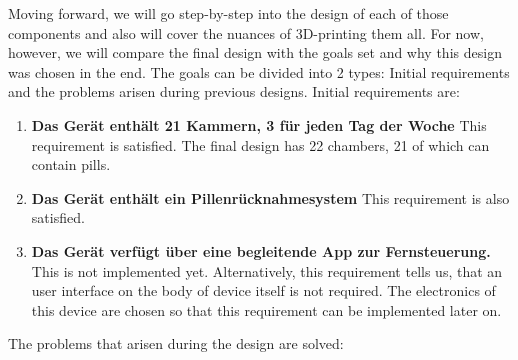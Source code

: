 Moving forward, we will go step-by-step into the design of each of those components and also will cover the nuances of 3D-printing them all. For now, however, we will compare the final design with the goals set and why this design was chosen in the end. The goals can be divided into 2 types: Initial requirements and the problems arisen during previous designs. Initial requirements are:
\begin{enumerate}
	\item{\textbf{Das Gerät enthält 21 Kammern, 3 für jeden Tag der Woche}} This requirement is satisfied. The final design has 22 chambers, 21 of which can contain pills.
	\item{\textbf{Das Gerät enthält ein Pillenrücknahmesystem}} This requirement is also satisfied. 
	\item{\textbf{Das Gerät verfügt über eine begleitende App zur Fernsteuerung.}} This is not implemented yet. Alternatively, this requirement tells us, that an user interface on the body of device itself is not required. The electronics of this device are chosen so that this requirement can be implemented later on.
\end{enumerate}
The problems that arisen during the design are solved:
